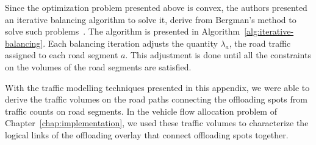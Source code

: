 Since the optimization problem presented above is convex, the authors presented an iterative balancing algorithm to solve it, derive from Bergman's method to solve such problems~\cite{bregman1967proof}. The algorithm is presented in Algorithm~\ref{alg:iterative-balancing}. Each balancing iteration adjusts the quantity $\lambda_{a}$, the road traffic assigned to each road segment $a$. This adjustment is done until all the constraints on the volumes of the road segments are satisfied.

With the traffic modelling techniques presented in this appendix, we were able to derive the traffic volumes on the road paths connecting the offloading spots from traffic counts on road segments. In the vehicle flow allocation problem of Chapter~\ref{chap:implementation}, we used these traffic volumes to characterize the logical links of the offloading overlay that connect offloading spots together.